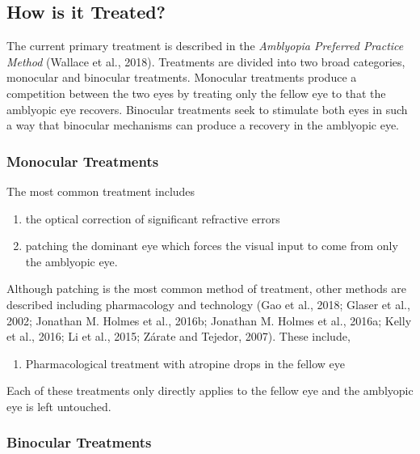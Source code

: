 \documentclass[
  onecolumn]{article}
\providecommand{\tightlist}{%
  \setlength{\itemsep}{0pt}\setlength{\parskip}{0pt}}
\begin{document}
\hypertarget{how-is-it-treated}{%
\subsection{How is it Treated?}\label{how-is-it-treated}}

The current primary treatment is described in the \emph{Amblyopia
Preferred Practice Method} (Wallace et al., 2018). Treatments are
divided into two broad categories, monocular and binocular treatments.
Monocular treatments produce a competition between the two eyes by
treating only the fellow eye to that the amblyopic eye recovers.
Binocular treatments seek to stimulate both eyes in such a way that
binocular mechanisms can produce a recovery in the amblyopic eye.

\hypertarget{monocular-treatments}{%
\subsubsection{Monocular Treatments}\label{monocular-treatments}}

The most common treatment includes

\begin{enumerate}
\def\labelenumi{\arabic{enumi}.}
\tightlist
\item
  the optical correction of significant refractive errors
\item
  patching the dominant eye which forces the visual input to come from
  only the amblyopic eye.
\end{enumerate}

Although patching is the most common method of treatment, other methods
are described including pharmacology and technology (Gao et al., 2018;
Glaser et al., 2002; Jonathan M. Holmes et al., 2016b; Jonathan M.
Holmes et al., 2016a; Kelly et al., 2016; Li et al., 2015; Zárate and
Tejedor, 2007). These include,

\begin{enumerate}
\def\labelenumi{\arabic{enumi}.}
\setcounter{enumi}{2}
\tightlist
\item
  Pharmacological treatment with atropine drops in the fellow eye
\end{enumerate}

Each of these treatments only directly applies to the fellow eye and the
amblyopic eye is left untouched.

\hypertarget{binocular-treatments}{%
\subsubsection{Binocular Treatments}\label{binocular-treatments}}
\end{document}
